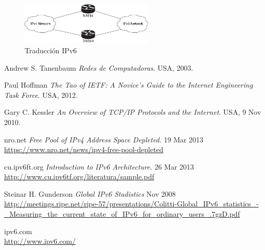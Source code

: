 \documentclass[11pt,a4paper]{article}
\begin{document}
\begin{figure}[h!]
 \centering
 \includegraphics[width=0.57\textwidth]{ipv6_translation.jpg}
 \caption[Traducción IPv6]{Traducción IPv6}
\end{figure}

\newpage
\begin{thebibliography}{9}

  Andrew S. Tanenbaum
  \emph{Redes de Computadoras}.
  USA,
  2003.

  Paul Hoffman
  \emph{The Tao of IETF: A Novice's Guide to the Internet Engineering Task Force}.
  USA,
  2012.
		
  Gary C. Kessler
  \emph{An Overview of TCP/IP Protocols and the Internet}.
  USA,
  9 Nov 2010.
		
 nro.net
 \emph{Free Pool of IPv4 Address Space Depleted.} 
 19 Mar 2013\\
	\url{https://www.nro.net/news/ipv4-free-pool-depleted}	

 cu.ipv6ft.org 
 \emph{Introduction to IPv6 Architecture.} 
 26 Mar 2013\\
	\url{http://www.cu.ipv6tf.org/literatura/sample.pdf}

 Steinar H. Gunderson
 \emph{Global IPv6 Stadistics}
 Nov 2008\\
 \url{http://meetings.ripe.net/ripe-57/presentations/Colitti-Global_IPv6_statistics_-
 _Measuring_the_current_state_of_IPv6_for_ordinary_users_.7gzD.pdf}
		
 ipv6.com\\
 \url{http://www.ipv6.com/}		
					
\end{thebibliography}
\end{document}
